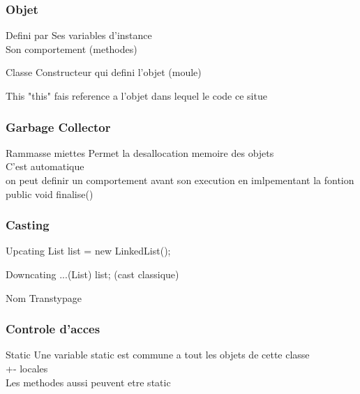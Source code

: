 \documentclass[12pt,a4paper,twoside]{beamer}
\begin{document}
\begin{frame}
\frametitle{Objet}
\begin{block}{Defini par }
Ses variables d'instance\\
Son comportement (methodes)\\
\end{block}
\begin{block}{Classe}
Constructeur qui defini l'objet (moule)\\
\end{block}
\begin{block}{This}
"this" fais reference a l'objet dans lequel le code ce situe\\
\end{block}
\end{frame}
\begin{frame}
\frametitle{Garbage Collector}
\begin{block}{Rammasse miettes}
Permet la desallocation memoire des objets\\
C'est automatique\\
on peut definir un comportement avant son execution en imlpementant la fontion \\
public void finalise()\\
\end{block}
\end{frame}
\begin{frame}
\frametitle{Casting}
\begin{block}{Upcating}
List list = new LinkedList();\\
\end{block}
\begin{block}{Downcating}
...(List) list; (cast classique)\\
\end{block}
\begin{block}{Nom}
Transtypage\\
\end{block}
\end{frame}
\begin{frame}
\frametitle{Controle d'acces}
\begin{block}{Static}
Une variable static est commune a tout les objets de cette classe\\
+- locales\\
Les methodes aussi peuvent etre static\\
\end{block}
\end{frame}
\end{document}
